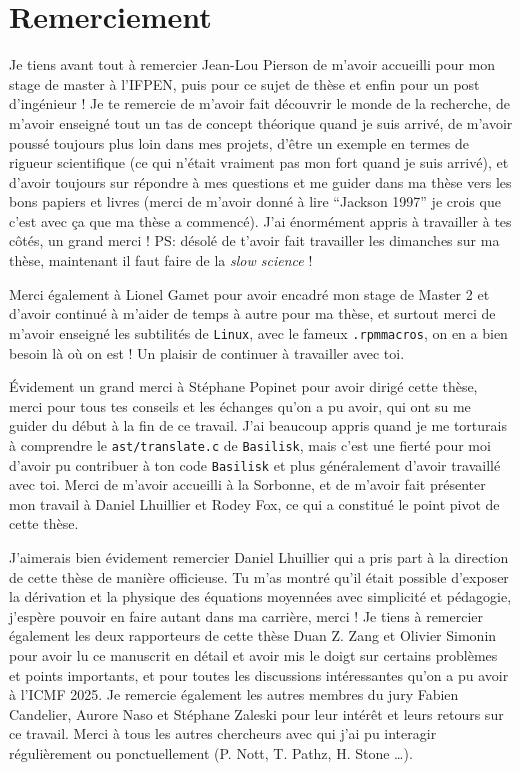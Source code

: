 \chapter*{\centering Remerciement}
\noindent 
Je tiens avant tout à remercier Jean-Lou Pierson de m'avoir accueilli pour mon stage de master à l'IFPEN, puis pour ce sujet de thèse et enfin pour un post d'ingénieur ! 
Je te remercie de m'avoir fait découvrir le monde de la recherche, 
de m'avoir enseigné tout un tas de concept théorique quand je suis arrivé, 
de m'avoir poussé toujours plus loin dans mes projets, 
d'être un exemple en termes de rigueur scientifique (ce qui n'était vraiment pas mon fort quand je suis arrivé), et 
d'avoir toujours sur répondre à mes questions et me guider dans ma thèse vers les bons papiers et livres (merci de m'avoir donné à lire ``Jackson 1997'' je crois que c'est avec ça que ma thèse a commencé).
J'ai énormément  appris à travailler à tes côtés, un grand merci !
PS: désolé de t'avoir fait travailler les dimanches sur ma thèse,  maintenant il faut faire de la \textit{slow science} ! 

Merci également à Lionel Gamet pour avoir encadré mon stage de Master 2 et d'avoir continué à m'aider de temps à autre pour ma thèse, et surtout merci de m'avoir enseigné les subtilités de \texttt{Linux}, avec le fameux \texttt{.rpmmacros}, on en a bien besoin là où on est !  
Un plaisir de continuer à travailler avec toi.
 
\'Evidement un grand merci à Stéphane Popinet pour avoir dirigé cette thèse, merci pour tous tes conseils et les échanges qu'on a pu avoir, qui ont su me guider du début à la fin de ce travail. 
J'ai beaucoup appris quand je me torturais à comprendre le \texttt{ast/translate.c} de \texttt{Basilisk}, mais c'est une fierté pour moi d'avoir pu contribuer à ton code \texttt{Basilisk} et plus généralement d'avoir travaillé avec toi. 
Merci de m'avoir accueilli à la Sorbonne, et de m'avoir fait présenter mon travail à Daniel Lhuillier et Rodey Fox, ce qui a constitué le point pivot de cette thèse.  

J'aimerais bien évidement remercier Daniel Lhuillier qui a pris part à la direction de cette thèse de manière  officieuse. 
Tu m'as montré qu'il était possible d'exposer la dérivation et la physique des équations moyennées avec simplicité et pédagogie, j'espère pouvoir en faire autant dans ma carrière, merci !  
Je tiens à remercier également les deux rapporteurs de cette thèse Duan Z. Zang et Olivier Simonin pour avoir lu ce manuscrit en détail et avoir mis le doigt sur certains problèmes et points importants, et pour toutes les discussions intéressantes qu'on a pu avoir à l'ICMF 2025. 
Je remercie également les autres membres du jury Fabien Candelier, Aurore Naso et Stéphane Zaleski pour leur intérêt et leurs retours sur ce travail. 
Merci à tous les autres chercheurs avec qui j'ai pu interagir régulièrement ou ponctuellement (P. Nott,  T. Pathz, H. Stone \ldots).%


